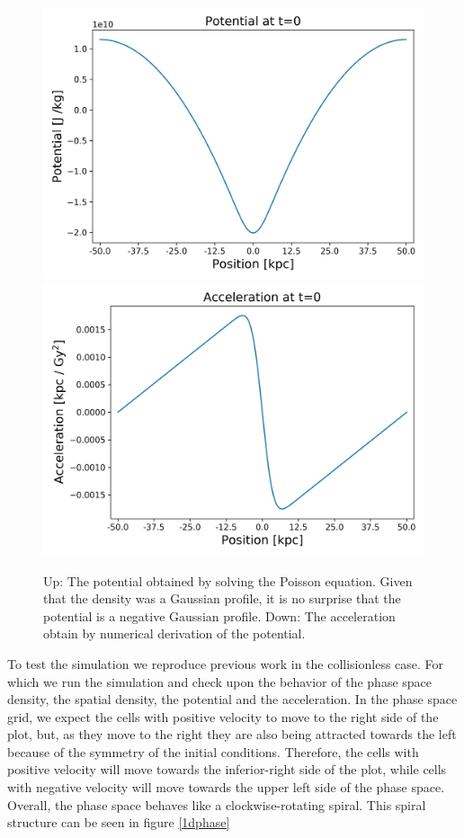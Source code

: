 \begin{figure}[h!]
    \centering
    \includegraphics[scale=0.6]{imag/1dInitPot.png}
    \includegraphics[scale=0.6]{imag/1dInitAcce.png}
    \caption{Up: The potential obtained by solving the Poisson equation. Given that the density was a Gaussian profile, it is no surprise that the potential is a negative Gaussian profile. Down: The acceleration obtain by numerical derivation of the potential.}
    \label{1dInit2}
\end{figure}

To test the simulation we reproduce previous work in the collisionless case.
For which we run the simulation and check upon the behavior of the phase space density, the spatial density, the potential and the acceleration.
In the phase space grid, we expect the cells with positive velocity to move to the right side of the plot, but, as they move to the right they are also being attracted towards the left because of the symmetry of the initial conditions. Therefore, the cells with positive velocity will move towards the inferior-right side of the plot, while cells with negative velocity will move towards the upper left side of the phase space. Overall, the phase space behaves like a clockwise-rotating spiral. This spiral structure can be seen in figure \ref{1dphase}

